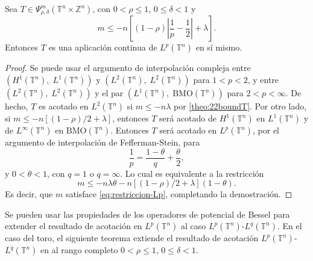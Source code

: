 \begin{theorem}
	Sea $T \in \Psi^m_{\rho, \delta}(\mathbb{T}^n \times \mathbb{Z}^n) $, con $0 < \rho \leq 1$, $0 \leq \delta < 1$ y  
	\begin{equation}
		m \leq - n \left[(1-\rho)\left|\frac{1}{p} - \frac{1}{2}\right| + \lambda\right] .
		\label{eq:restriccion-Lp}
	\end{equation} 
	Entonces $T$ es una aplicación continua de $L^p(\mathbb{T}^n)$ en sí mismo.
	\label{teo:cotas-Lp}
\end{theorem}
\begin{proof}
	Se puede usar el argumento de interpolación compleja entre $(H^1(\mathbb{T}^n),\; L^1(\mathbb{T}^n))$ y  $(L^2(\mathbb{T}^n),\; L^2(\mathbb{T}^n))$ para $1 < p < 2$, y entre $(L^2(\mathbb{T}^n),\; L^2(\mathbb{T}^n))$ y el par $(L^1(\mathbb{T}^n),\; \mathrm{BMO}(\mathbb{T}^n))$ para $2 < p<\infty$. De hecho, $T$ es acotado en $L^2(\mathbb{T}^n)$ si $m\leq -n\lambda$ por \cref{theo:22boundT}. Por otro lado, si $m\leq -n[(1-\rho)/2 + \lambda]$, entonces $T$ será acotado de $H^1(\mathbb{T}^n)$ en $L^1(\mathbb{T}^n)$ y de $L^\infty(\mathbb{T}^n)$ en $\mathrm{BMO}(\mathbb{T}^n)$. Entonces $T$ será acotado en $L^p(\mathbb{T}^n)$, por el argumento de interpolación de Fefferman-Stein, para
	\begin{equation*}
		\frac{1}{p} = \frac{1-\theta}{q} + \frac{\theta}{2},
	\end{equation*}
	y $0<\theta<1$, con $q=1$ o $q=\infty$. Lo cual es equivalente a la restricción 
	\begin{equation*}
		m \leq -n\lambda\theta - n\left[(1-\rho)/2 +\lambda\right](1 - \theta).
	\end{equation*}
	Es decir, que $m$ satisface \cref{eq:restriccion-Lp}, completando la demostración.
\end{proof}
Se pueden usar las propiedades de los operadores de potencial de Bessel para extender el resultado de acotación en $L^p(\mathbb{T}^n)$ al caso $L^p(\mathbb{T}^n)$-$L^q(\mathbb{T}^n)$. En el caso del toro, el siguiente teorema extiende el resultado de acotación $L^p(\mathbb{T}^n)$-$L^q(\mathbb{T}^n)$ en  \cite{cardona-delgado-kumar} al rango completo $0 < \rho \leq 1$, $0 \leq \delta < 1$.
